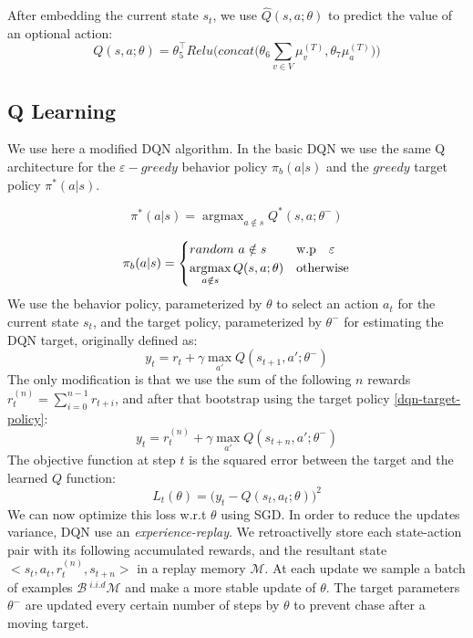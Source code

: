 \documentclass[10pt,a4paper,draft]{article}
\DeclareMathOperator*{\argmax}{argmax}
\begin{document}
After embedding the current state $s_t$, we use $\widehat{Q}(s,a;\theta)$ to predict the value of an optional action:
\begin{equation}
	Q(s,a;\theta) = \theta_5^\top Relu\bigg(concat\big(\theta_6 \sum_{v \in V} \mu_v^{(T)}, \theta_7 \mu_a^{(T)}\big)\bigg)
	\label{s2v-dqn-qfunc}
\end{equation}

\subsection{Q Learning}
We use here a modified DQN algorithm. In the basic DQN we use the same Q architecture for the $\varepsilon-greedy$ behavior policy $\pi_b(a|s)$ and the $greedy$ target policy $\pi^*(a|s)$.

\begin{equation}
\pi^*(a|s) = \argmax_{a \notin s}{Q^*(s,a;\theta^-)}
\label{dqn-target-policy}
\end{equation}

\begin{equation}
\pi_b(a|s) = 
\begin{dcases}
    random \ {a \notin s} 					& \text{w.p  \ \ } \varepsilon \\
    \argmax_{a \notin s}{Q(s,a;\theta)} 	& \text{otherwise}
\end{dcases}
\label{dqn-behavior-policy}
\end{equation}
We use the behavior policy, parameterized by $\theta$ to select an action $a_t$ for the current state $s_t$, and the target policy, parameterized by $\theta^-$ for estimating the DQN target, originally defined as:
\begin{equation}
y_t = r_t + \gamma\max_{a'}Q(s_{t+1},a';\theta^-)
\label{orig-dqn-target}
\end{equation}
The only modification is that we use the sum of the following $n$ rewards $r_t^{(n)} = \sum_{i=0}^{n-1} r_{t+i}$, and after that bootstrap using the target policy \eqref{dqn-target-policy}:
\begin{equation}
y_t = r_t^{(n)} + \gamma\max_{a'}Q(s_{t+n},a';\theta^-)
\label{s2vdqn_target}
\end{equation}
The objective function at step $t$ is the squared error between the target and the learned $Q$ function:
\begin{equation}
L_t(\theta) = \big(y_t - Q(s_t,a_t;\theta)\big)^2
\label{dqn_objective}
\end{equation}
We can now optimize this loss w.r.t $\theta$ using SGD. In order to reduce the updates variance, DQN use an \textit{experience-replay}. We retroactivelly store each state-action pair with its following accumulated rewards, and the resultant state $<s_t, a_t, r_t^{(n)}, s_{t+n}>$ in a replay memory $\mathcal{M}$. At each update we sample a batch of examples $\mathcal{B} ~^{i.i.d} \mathcal{M}$ and make a more stable update of $\theta$. The target parameters $\theta^-$ are updated every certain number of steps by $\theta$ to prevent chase after a moving target.
\end{document}
